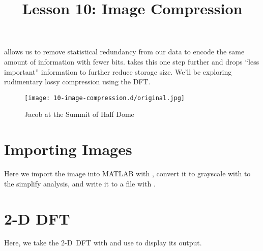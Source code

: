 \documentclass{article}
\title{Lesson 10: Image Compression}
\begin{document}
\renderTitle

 allows us to remove statistical redundancy from our
data to encode the same amount of information with fewer bits.
 takes this one step further and drops
\enquote{less important} information to further reduce storage size.
We'll be exploring rudimentary lossy compression using the DFT.

\begin{figure}[ht!]
	\texttt{[image: 10-image-compression.d/original.jpg]}
	\caption{Jacob at the Summit of Half Dome}
\end{figure}

\section{Importing Images}


Here we import the image into MATLAB with , convert it to
grayscale with  to the simplify analysis, and write it to a
file with .

\section{2-D DFT}


Here, we take the 2-D~DFT with  and use  to display its
output.
\end{document}
